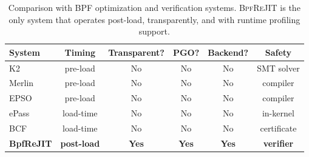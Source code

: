\begin{table}[t]
  \centering
  \caption{Comparison with BPF optimization and verification systems.
  \textsc{BpfReJIT} is the only system that operates post-load,
  transparently, and with runtime profiling support.}
  \label{tab:existing_work}
  \small
  \begin{tabular}{lccccc}
    \toprule
    System & Timing & Transparent? & PGO? & Backend? & Safety \\
    \midrule
    K2~\cite{k2}          & pre-load  & No  & No  & No  & SMT solver \\
    Merlin~\cite{merlin}  & pre-load  & No  & No  & No  & compiler \\
    EPSO~\cite{epso}      & pre-load  & No  & No  & No  & compiler \\
    ePass~\cite{epass}    & load-time & No  & No  & No  & in-kernel \\
    BCF~\cite{bcf}        & load-time & No  & No  & No  & certificate \\
    \textbf{BpfReJIT}     & \textbf{post-load} & \textbf{Yes} & \textbf{Yes} & \textbf{Yes} & \textbf{verifier} \\
    \bottomrule
  \end{tabular}
\end{table}
